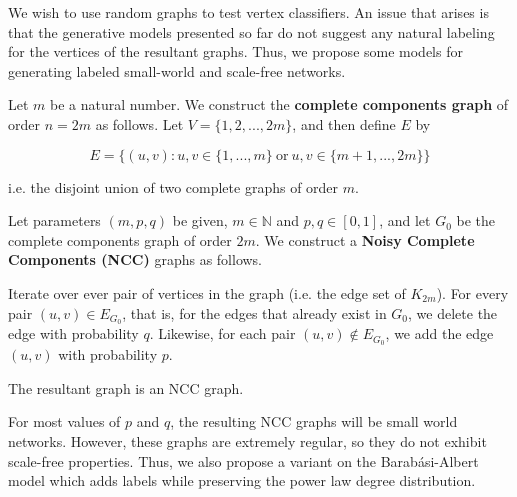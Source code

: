 We wish to use random graphs to test vertex classifiers. An issue that arises is
that the generative models presented so far do not suggest any natural labeling
for the vertices of the resultant graphs. Thus, we propose some models for
generating labeled small-world and scale-free networks.

\begin{definition}
  Let $m$ be a natural number. We construct the \textbf{complete components
    graph} of order $n = 2m$ as follows. Let $V = \{1,2, ..., 2m\}$, and then define
  $E$ by

  \[
    E = \{ (u,v) : u,v \in \{1,...,m\} ~\text{or}~ u,v \in \{m+1,...,2m\} \}
  \]

  i.e. the disjoint union of two complete graphs of order $m$.
\end{definition}

\begin{definition}
  Let parameters $(m,p,q)$ be given, $m \in \mathbb{N}$ and $p,q \in [0,1]$, and
  let $G_0$ be the complete components graph of order $2m$. We construct a
  \textbf{Noisy Complete Components (NCC)} graphs as follows.

  Iterate over ever pair of vertices in the graph (i.e. the edge set of
  $K_{2m}$). For every pair $(u,v) \in E_{G_0}$, that is, for the edges that
  already exist in $G_0$, we delete the edge with probability $q$. Likewise, for
  each pair $(u,v) \notin E_{G_0}$, we add the edge $(u,v)$ with probability
  $p$.

  The resultant graph is an NCC graph.
\end{definition}

For most values of $p$ and $q$, the resulting NCC graphs will be small world
networks. However, these graphs are extremely regular, so they do not exhibit
scale-free properties. Thus, we also propose a variant on the Barab\'asi-Albert
model which adds labels while preserving the power law degree distribution.



